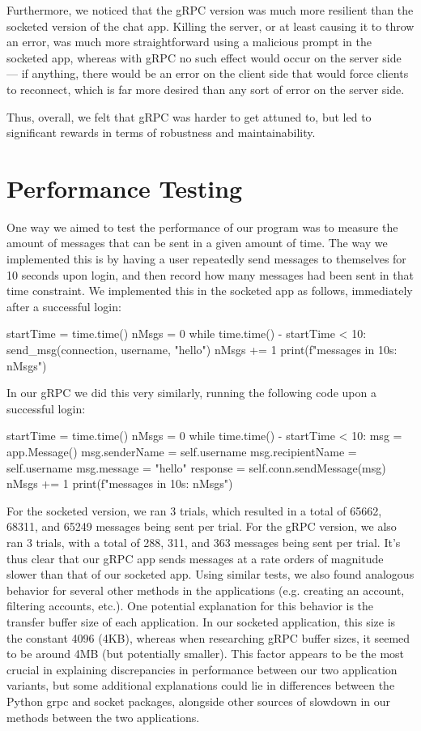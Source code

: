 \documentclass[
	a4paper, %
	10pt, %
	unnumberedsections, %
	twoside, %
]{LTJournalArticle}
\begin{document}
Furthermore, we noticed that the gRPC version was much more resilient than the socketed version of the chat app. Killing the server, or at least causing it to throw an error, was much more straightforward using a malicious prompt in the socketed app, whereas with gRPC no such effect would occur on the server side --- if anything, there would be an error on the client side that would force clients to reconnect, which is far more desired than any sort of error on the server side.

Thus, overall, we felt that gRPC was harder to get attuned to, but led to significant rewards in terms of robustness and maintainability. 

\section{Performance Testing}
One way we aimed to test the performance of our program was to measure the amount of messages that can be sent in a given amount of time. The way we implemented this is by having a user repeatedly send messages to themselves for 10 seconds upon login, and then record how many messages had been sent in that time constraint. We implemented this in the socketed app as follows, immediately after a successful login:
\begin{python}
startTime = time.time()
nMsgs = 0
while time.time() - startTime < 10:
	send_msg(connection, username, "hello")
	nMsgs += 1
print(f"messages in 10s: {nMsgs}")
\end{python}
In our gRPC we did this very similarly, running the following code upon a successful login:
\begin{python}
startTime = time.time()
nMsgs = 0
while time.time() - startTime < 10:
	msg = app.Message()
	msg.senderName = self.username
	msg.recipientName = self.username
	msg.message = "hello"
	response = self.conn.sendMessage(msg)
	nMsgs += 1
print(f"messages in 10s: {nMsgs}")
\end{python}
For the socketed version, we ran 3 trials, which resulted in a total of 65662, 68311, and 65249 messages being sent per trial. For the gRPC version, we also ran 3 trials, with a total of 288, 311, and 363 messages being sent per trial. It's thus clear that our gRPC app sends messages at a rate orders of magnitude slower than that of our socketed app. Using similar tests, we also found analogous behavior for several other methods in the applications (e.g. creating an account, filtering accounts, etc.). One potential explanation for this behavior is the transfer buffer size of each application. In our socketed application, this size is the constant 4096 (4KB), whereas when researching gRPC buffer sizes, it seemed to be around 4MB (but potentially smaller). This factor appears to be the most crucial in explaining discrepancies in performance between our two application variants, but some additional explanations could lie in differences between the Python grpc and socket packages, alongside other sources of slowdown in our methods between the two applications.
\end{document}
